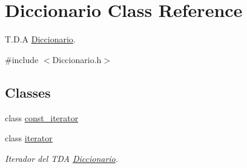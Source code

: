 \hypertarget{classDiccionario}{\section{Diccionario Class Reference}
\label{classDiccionario}
}


T.\-D.\-A \hyperlink{classDiccionario}{Diccionario}.  




{\ttfamily \#include $<$Diccionario.\-h$>$}

\subsection*{Classes}
\begin{DoxyCompactItemize}
\item 
class \hyperlink{classDiccionario_1_1const__iterator}{const\-\_\-iterator}
\item 
class \hyperlink{classDiccionario_1_1iterator}{iterator}
\begin{DoxyCompactList}\small\item\em Iterador del T\-D\-A \hyperlink{classDiccionario}{Diccionario}. \end{DoxyCompactList}\end{DoxyCompactItemize}
